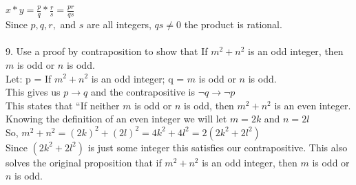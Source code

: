 \documentclass[11pt, oneside]{article}   	%
\begin{document}
$x * y = \frac {p}{q} * \frac{r}{s} = \frac{pr}{qs}$\\
Since $p, q, r,$ and $s$ are all integers, $qs\neq 0$ the product is rational. \\\\
9. Use a proof by contraposition to show that If $m^2 + n^2$  is an odd integer, then $m$ is odd or $n$ is odd.\\
Let: p = If $m^2 + n^2$  is an odd integer; q = $m$ is odd or $n$ is odd.\\
This gives us $p\to q$ and the contrapositive is $\neg q\to\neg p$\\
This states that ``If neither $m$ is odd or $n$ is odd, then $m^2 + n^2$  is an even integer.\\
Knowing the definition of an even integer we will let $m = 2k$ and $n = 2l$\\
So, $m^2 + n^2 = (2k)^2 + (2l)^2 = 4k^2 + 4l^2 = 2(2k^2 + 2l^2)$\\
Since $(2k^2 + 2l^2)$ is just some integer this satisfies our contrapositive. This also solves the original proposition that if $m^2 + n^2$  is an odd integer, then $m$ is odd or $n$ is odd.
\end{document}
